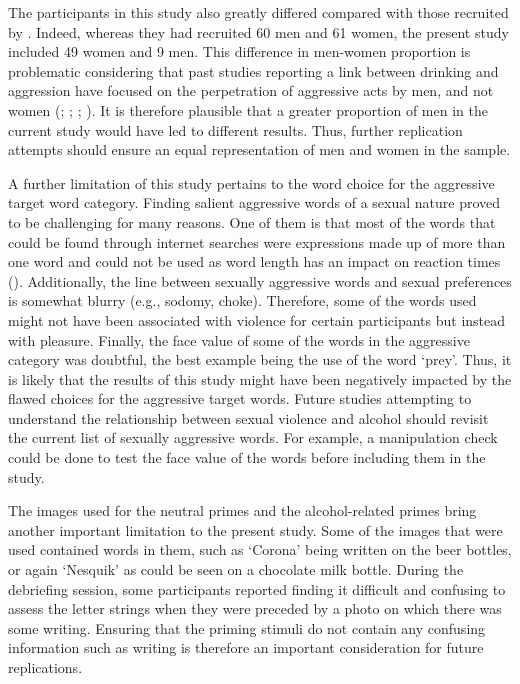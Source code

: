 \documentclass[serif, authorddate, twocolumn, empirical]{jote-article}
\begin{document}
The participants in this study also greatly differed compared with those recruited by \textcite{BartholowHeinz2006}. Indeed, whereas they had recruited 60 men and 61 women, the present study included 49 women and 9 men. This difference in men-women proportion is problematic considering that past studies reporting a link between drinking and aggression have focused on the perpetration of aggressive acts by men, and not women (\cite{JakupcakLisakRoemer2002}; \cite{GidyczWarkentinOrchowski2007}; \cite{AbbeyClintonSherrodMcAuslanZawackiBuck2003}; \cite{LockeMahalik2005}). It is therefore plausible that a greater proportion of men in the current study would have led to different results. Thus, further replication attempts should ensure an equal representation of men and women in the sample.

A further limitation of this study pertains to the word choice for the aggressive target word category. Finding salient aggressive words of a sexual nature proved to be challenging for many reasons. One of them is that most of the words that could be found through internet searches were expressions made up of more than one word and could not be used as word length has an impact on reaction times (\cite{BartholowHeinz2006}). Additionally, the line between sexually aggressive words and sexual preferences is somewhat blurry (e.g., sodomy, choke). Therefore, some of the words used might not have been associated with violence for certain participants but instead with pleasure. Finally, the face value of some of the words in the aggressive category was doubtful, the best example being the use of the word ‘prey’. Thus, it is likely that the results of this study might have been negatively impacted by the flawed choices for the aggressive target words. Future studies attempting to understand the relationship between sexual violence and alcohol should revisit the current list of sexually aggressive words. For example, a manipulation check could be done to test the face value of the words before including them in the study.

The images used for the neutral primes and the alcohol-related primes bring another important limitation to the present study. Some of the images that were used contained words in them, such as ‘Corona’ being written on the beer bottles, or again ‘Nesquik’ as could be seen on a chocolate milk bottle. During the debriefing session, some participants reported finding it difficult and confusing to assess the letter strings when they were preceded by a photo on which there was some writing. Ensuring that the priming stimuli do not contain any confusing information such as writing is therefore an important consideration for future replications.
\end{document}
